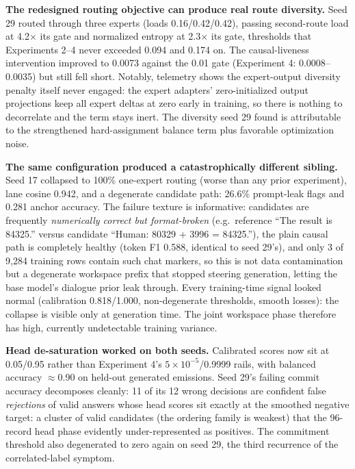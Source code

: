 \documentclass[10pt,a4paper]{article}
\begin{document}
\textbf{The redesigned routing objective can produce real route diversity.}
Seed 29 routed through three experts (loads 0.16/0.42/0.42), passing
second-route load at 4.2$\times$ its gate and normalized entropy at
2.3$\times$ its gate, thresholds that Experiments 2--4 never exceeded 0.094 and
0.174 on. The causal-liveness intervention improved to 0.0073 against the
0.01 gate (Experiment 4: 0.0008--0.0035) but still fell short. Notably, telemetry
shows the expert-output diversity penalty itself never engaged: the expert
adapters' zero-initialized output projections keep all expert deltas at zero
early in training, so there is nothing to decorrelate and the term stays
inert. The diversity seed 29 found is attributable to the strengthened
hard-assignment balance term plus favorable optimization noise.

\textbf{The same configuration produced a catastrophically different sibling.}
Seed 17 collapsed to 100\% one-expert routing (worse than any prior experiment),
lane cosine 0.942, and a degenerate candidate path: 26.6\% prompt-leak flags
and 0.281 anchor accuracy. The failure texture is informative: candidates are
frequently \emph{numerically correct but format-broken} (e.g.\ reference
``The result is 84325.'' versus candidate ``Human: 80329 + 3996 = 84325.''),
the plain causal path is completely healthy (token F1 0.588, identical to
seed 29's), and only 3 of 9,284 training rows contain such chat markers,
so this is not data contamination but a degenerate workspace prefix that
stopped steering generation, letting the base model's dialogue prior leak
through. Every training-time signal looked normal (calibration 0.818/1.000,
non-degenerate thresholds, smooth losses): the collapse is visible only at
generation time. The joint workspace phase therefore has high, currently
undetectable training variance.

\textbf{Head de-saturation worked on both seeds.} Calibrated scores now sit
at 0.05/0.95 rather than Experiment 4's $5\times10^{-5}$/0.9999 rails, with
balanced accuracy $\approx$0.90 on held-out generated emissions. Seed 29's
failing commit accuracy decomposes cleanly: 11 of its 12 wrong decisions are
confident false \emph{rejections} of valid answers whose head scores sit
exactly at the smoothed negative target: a cluster of valid candidates
(the ordering family is weakest) that the 96-record head phase evidently
under-represented as positives. The commitment threshold also degenerated to
zero again on seed 29, the third recurrence of the correlated-label symptom.
\end{document}
